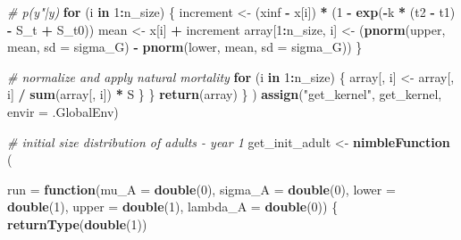\documentclass[
]{article}
\newenvironment{Shaded}{\begin{snugshade}}{\end{snugshade}}
\newcommand{\AttributeTok}[1]{\textcolor[rgb]{0.13,0.29,0.53}{#1}}
\newcommand{\CommentTok}[1]{\textcolor[rgb]{0.56,0.35,0.01}{\textit{#1}}}
\newcommand{\ControlFlowTok}[1]{\textcolor[rgb]{0.13,0.29,0.53}{\textbf{#1}}}
\newcommand{\DecValTok}[1]{\textcolor[rgb]{0.00,0.00,0.81}{#1}}
\newcommand{\FunctionTok}[1]{\textcolor[rgb]{0.13,0.29,0.53}{\textbf{#1}}}
\newcommand{\NormalTok}[1]{#1}
\newcommand{\OtherTok}[1]{\textcolor[rgb]{0.56,0.35,0.01}{#1}}
\newcommand{\SpecialCharTok}[1]{\textcolor[rgb]{0.81,0.36,0.00}{\textbf{#1}}}
\newcommand{\StringTok}[1]{\textcolor[rgb]{0.31,0.60,0.02}{#1}}
\begin{document}
\begin{Shaded}
\begin{Highlighting}[]
        \CommentTok{\# p(y"|y)}
        \ControlFlowTok{for}\NormalTok{ (i }\ControlFlowTok{in} \DecValTok{1}\SpecialCharTok{:}\NormalTok{n\_size) \{}
\NormalTok{          increment }\OtherTok{\textless{}{-}}\NormalTok{ (xinf }\SpecialCharTok{{-}}\NormalTok{ x[i]) }\SpecialCharTok{*}
\NormalTok{            (}\DecValTok{1} \SpecialCharTok{{-}} \FunctionTok{exp}\NormalTok{(}\SpecialCharTok{{-}}\NormalTok{k }\SpecialCharTok{*}\NormalTok{ (t2 }\SpecialCharTok{{-}}\NormalTok{ t1) }\SpecialCharTok{{-}}\NormalTok{ S\_t }\SpecialCharTok{+}\NormalTok{ S\_t0))}
\NormalTok{          mean }\OtherTok{\textless{}{-}}\NormalTok{ x[i] }\SpecialCharTok{+}\NormalTok{ increment}
\NormalTok{          array[}\DecValTok{1}\SpecialCharTok{:}\NormalTok{n\_size, i] }\OtherTok{\textless{}{-}}\NormalTok{ (}\FunctionTok{pnorm}\NormalTok{(upper, mean, }\AttributeTok{sd =}\NormalTok{ sigma\_G) }\SpecialCharTok{{-}}
                                   \FunctionTok{pnorm}\NormalTok{(lower, mean, }\AttributeTok{sd =}\NormalTok{ sigma\_G))}
\NormalTok{        \}}
        
        \CommentTok{\# normalize and apply natural mortality}
        \ControlFlowTok{for}\NormalTok{ (i }\ControlFlowTok{in} \DecValTok{1}\SpecialCharTok{:}\NormalTok{n\_size) \{}
\NormalTok{          array[, i] }\OtherTok{\textless{}{-}}\NormalTok{ array[, i] }\SpecialCharTok{/} \FunctionTok{sum}\NormalTok{(array[, i]) }\SpecialCharTok{*}\NormalTok{ S}
\NormalTok{        \}}
\NormalTok{      \}}
      \FunctionTok{return}\NormalTok{(array)}
\NormalTok{    \}}
\NormalTok{  )}
  \FunctionTok{assign}\NormalTok{(}\StringTok{"get\_kernel"}\NormalTok{, get\_kernel, }\AttributeTok{envir =}\NormalTok{ .GlobalEnv)}
  
  \CommentTok{\# initial size distribution of adults {-} year 1}
\NormalTok{  get\_init\_adult }\OtherTok{\textless{}{-}} \FunctionTok{nimbleFunction}\NormalTok{ (}
    
    \AttributeTok{run =} \ControlFlowTok{function}\NormalTok{(}\AttributeTok{mu\_A =} \FunctionTok{double}\NormalTok{(}\DecValTok{0}\NormalTok{), }\AttributeTok{sigma\_A =} \FunctionTok{double}\NormalTok{(}\DecValTok{0}\NormalTok{),}
                   \AttributeTok{lower =} \FunctionTok{double}\NormalTok{(}\DecValTok{1}\NormalTok{), }\AttributeTok{upper =} \FunctionTok{double}\NormalTok{(}\DecValTok{1}\NormalTok{),}
                   \AttributeTok{lambda\_A =} \FunctionTok{double}\NormalTok{(}\DecValTok{0}\NormalTok{))}
\NormalTok{    \{}
      \FunctionTok{returnType}\NormalTok{(}\FunctionTok{double}\NormalTok{(}\DecValTok{1}\NormalTok{))}
      

\end{Highlighting}
\end{Shaded}
\end{document}
